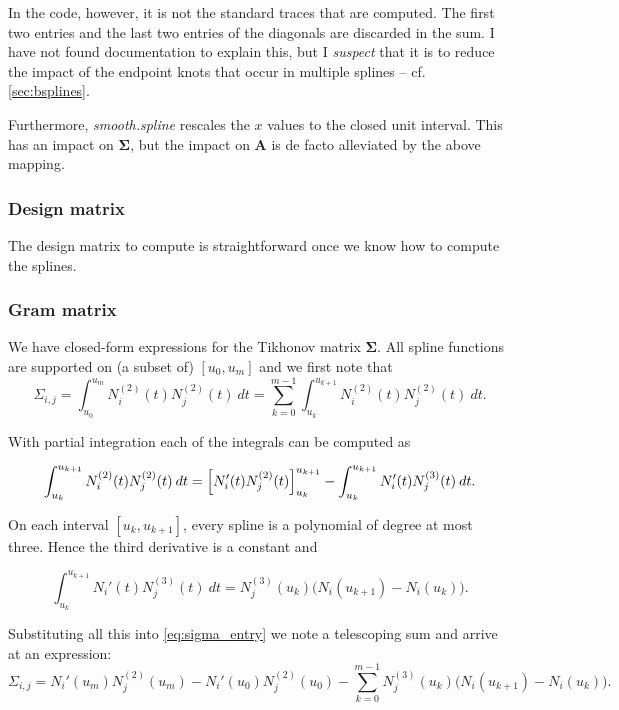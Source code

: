 \documentclass[a4paper]{scrartcl}
\newcommand{\mat}[1]{\ensuremath{\bm{#1}}}
\newcommand\dd{\ensuremath{\:d}}
\begin{document}
In the code, however, it is not the standard traces that are computed.
The first two entries and the last two entries of the diagonals are discarded in the sum.
I have not found documentation to explain this, but I \emph{suspect} that it is to reduce the impact of the endpoint knots that occur in multiple splines -- cf. \cref{sec:bsplines}.

Furthermore, \textit{smooth.spline} rescales the $x$ values to the closed unit interval.
This has an impact on $\mat\Sigma$, but the impact on $\mat A$ is de facto alleviated by the above mapping.


\subsubsection{Design matrix}

The design matrix to compute is straightforward once we know how to compute the splines.


\subsubsection{Gram matrix}

We have closed-form expressions for the Tikhonov matrix $\mat\Sigma$.
All spline functions are supported on (a subset of) $[u_0, u_m]$ and we first note that
\begin{equation}
    \label{eq:sigma_entry}
    \Sigma_{i,j}
    = \int_{u_0}^{u_m} N_i^{(2)}(t) N_j^{(2)}(t) \dd t
    = \sum_{k = 0}^{m - 1} \int_{u_k}^{u_{k+1}} N_i^{(2)}(t) N_j^{(2)}(t) \dd t.
\end{equation}

With partial integration each of the integrals can be computed as

\begin{equation*}
    \int_{u_k}^{u_{k+1}} N_i^{(2)}(t) N_j^{(2)}(t) \dd t
    = \Bigl[ N_i'(t) N_j^{(2)}(t) \Bigr]_{u_k}^{u_{k+1}} -
    \int_{u_k}^{u_{k+1}} N_i'(t) N_j^{(3)}(t) \dd t.
\end{equation*}

On each interval $[u_k, u_{k+1}]$, every spline is a polynomial of degree at most three.
Hence the third derivative is a constant and

\begin{equation*}
    \int_{u_k}^{u_{k+1}} N_i'(t) N_j^{(3)}(t) \dd t
    = N_j^{(3)}(u_k) \bigl(N_i(u_{k+1}) - N_i(u_k)\bigr).
\end{equation*}

Substituting all this into \cref{eq:sigma_entry} we note a telescoping sum and arrive at an expression:
\begin{equation*}
    \Sigma_{i,j}
    = N_i'(u_m) N_j^{(2)}(u_m) - N_i'(u_0) N_j^{(2)}(u_0) 
    - \sum_{k = 0}^{m - 1} N_j^{(3)}(u_k) \bigl(N_i(u_{k+1}) - N_i(u_k)\bigr).
\end{equation*}
\end{document}
